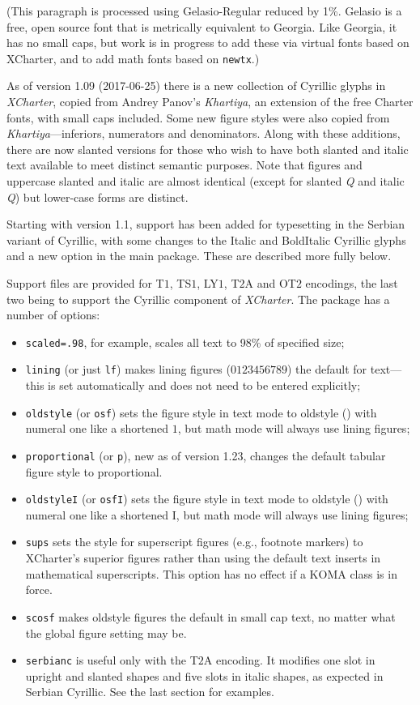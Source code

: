 \documentclass[11pt]{article}
\begin{document}
{\gelasio (This paragraph is processed using Gelasio-Regular reduced by 1\%. Gelasio is a free, open source font that is metrically equivalent to Georgia. Like Georgia, it has no small caps, but work is in progress to add these via virtual fonts based on XCharter, and to add math fonts based on {\tt newtx}.)}

As of version 1.09 (2017-06-25) there is a new collection of Cyrillic glyphs in \emph{XCharter}, copied from Andrey Panov's \emph{Khartiya}, an extension of the free Charter fonts, with small caps included. Some new figure styles were also copied from \emph{Khartiya}---inferiors, numerators and denominators. Along with these additions, there are now slanted versions for those who wish to have both slanted and italic text available to meet distinct semantic purposes. Note that figures and uppercase slanted and italic are almost identical (except for slanted \textsl{Q} and italic \textit{Q}) but lower-case forms are distinct.

Starting with version 1.1, support has been added for typesetting in the Serbian variant of Cyrillic, with some changes to the Italic and BoldItalic Cyrillic glyphs and a new option in the main package. These are described more fully below.

Support files are provided for T$1$, TS$1$, LY$1$, T$2$A and OT$2$ encodings, the last two being to support the Cyrillic component of \emph{XCharter}. The package has  a number of options:
\begin{itemize}
\item
{\tt scaled=.98}, for example, scales all text to 98\% of specified size;
\item {\tt lining} (or just {\tt lf}) makes lining figures ($0123456789$) the default for text---this is set automatically and does not need to be entered explicitly;
\item {\tt oldstyle} (or {\tt osf}) sets the figure style in text mode to oldstyle ({}) with numeral one like a shortened  $1$, but math mode will always use lining figures;
\item {\tt proportional} (or {\tt p}), new as of version 1.23, changes the default tabular figure style to proportional.
\item {\tt oldstyleI} (or {\tt osfI}) sets the figure style in text mode to oldstyle ({}) with numeral one like a shortened I, but math mode will always use lining figures;
\item {\tt sups} sets the style for superscript figures (e.g., footnote markers) to XCharter's superior figures rather than using the default text inserts in mathematical superscripts. This option has no effect if a KOMA class is in force.
\item {\tt scosf} makes oldstyle figures the default in small cap text, no matter what the global figure setting may be.
\item {\tt serbianc} is useful only with the T$2$A encoding. It modifies
one slot in upright and slanted shapes and five slots in italic shapes, as expected in Serbian Cyrillic. See the last section for examples.
\end{itemize}
\end{document}
